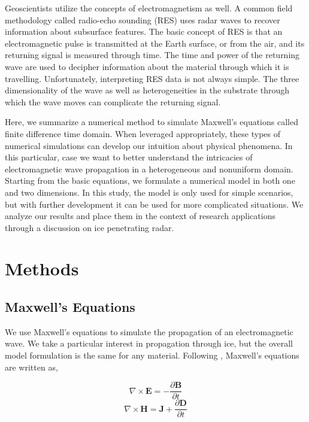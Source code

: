 \documentclass[a4paper]{article}
\begin{document}
Geoscientists utilize the concepts of electromagnetism as well. A common field methodology called radio-echo sounding (RES) uses radar waves to recover information about subsurface features. The basic concept of RES is that an electromagnetic pulse is transmitted at the Earth surface, or from the air, and its returning signal is measured through time. The time and power of the returning wave are used to decipher information about the material through which it is travelling.
Unfortunately, interpreting RES data is not always simple. The three dimensionality of the wave as well as heterogeneities in the substrate through which the wave moves can complicate the returning signal.

Here, we summarize a numerical method to simulate Maxwell's equations called finite difference time domain. When leveraged appropriately, these types of numerical simulations can develop our intuition about physical phenomena. In this particular, case we want to better understand the intricacies of electromagnetic wave propagation in a heterogeneous and nonuniform domain. Starting from the basic equations, we formulate a numerical model in both one and two dimensions. In
this study, the model is only used for simple scenarios, but with further development it can be used for more complicated situations. We analyze our results and place them in the context of research applications through a discussion on ice penetrating radar. 

\section{Methods}

\subsection{Maxwell's Equations}

We use Maxwell's equations to simulate the propagation of an electromagnetic wave. We take a particular interest in propagation through ice, but the overall model formulation is the same for any material. Following \citet{Griffiths1981}, Maxwell's equations are written as, 

\begin{equation}
    \nabla \times \textbf{E} = - \frac{\partial \textbf{B}}{\partial t}
    \label{eqn:E}
\end{equation}
\begin{equation}
    \nabla \times \textbf{H} = \textbf{J} + \frac{\partial \textbf{D}}{\partial t}
    \label{eqn:H}
\end{equation}
\end{document}
